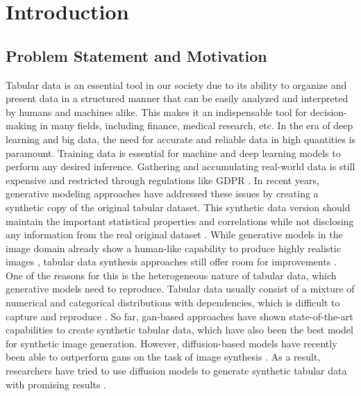 \chapter{Introduction}
\label{ch:introduction}

\section{Problem Statement and Motivation}
\label{ch:intro-problemStatement}

Tabular data is an essential tool in our society due to its ability to organize and present data in a structured manner
that can be easily analyzed and interpreted by humans and machines alike.
This makes it an indispensable tool for decision-making in many fields, including finance, medical research, etc.
In the era of deep learning and big data, the need for accurate and reliable data in high quantities is paramount.
Training data is essential for machine and deep learning \glspl{model} to perform any desired inference.
Gathering and accumulating real-world data is still expensive \cite{borisov2022DeepNeuralNetworks} and restricted through regulations like GDPR \cite{european_commission_regulation_2016}.
In recent years, generative modeling approaches have addressed these issues by creating a synthetic copy of the original tabular dataset.
This synthetic data version should maintain the important statistical properties and correlations while not disclosing any information from the real original dataset \cite{goodfellow2020GenerativeAdversarialNetworks, mottini2018AirlinePassengerName}.
While generative models in the image domain already show a human-like capability to produce highly realistic images \cite{dhariwal2021DiffusionModelsBeat},
tabular data synthesis approaches still offer room for improvements \cite{chundawat2022UniversalMetricRobust}.
One of the reasons for this is the heterogeneous nature of tabular data, which generative models need to reproduce.
Tabular data usually consist of a mixture of numerical and categorical distributions with dependencies, which is difficult to capture and reproduce \cite{borisov2022DeepNeuralNetworks}.
So far, \gls{gan}-based approaches have shown state-of-the-art capabilities to create synthetic tabular data, which have also been the best model for synthetic image generation.
However, diffusion-based models have recently been able to outperform \glspl{gan} on the task of image synthesis \cite{dhariwal2021DiffusionModelsBeat}.
As a result, researchers have tried to use diffusion models to generate synthetic tabular data with promising results \cite{kotelnikov2022TabDDPMModellingTabular, zheng2022DiffusionModelsMissing}.

